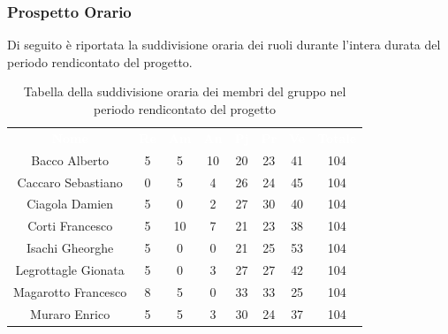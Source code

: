 \subsubsection{Prospetto Orario}
Di seguito è riportata la suddivisione oraria dei ruoli durante l'intera durata del periodo rendicontato del progetto.


\begin{table}[H]	
	\begin{center}
	    \begin{tabular}{cccccccc}
			\rowcolor{greySWEight}
			\textcolor{white}{\textbf{Nome}} & \textcolor{white}{\textbf{Re}} & \textcolor{white}{\textbf{Am}} & \textcolor{white}{\textbf{An}} & \textcolor{white}{\textbf{Pj}} & \textcolor{white}{\textbf{Pr}} & \textcolor{white}{\textbf{Ve}} & \textcolor{white}{\textbf{Totale}}
			\\			
			Bacco Alberto & 5 & 5 & 10 & 20 & 23 & 41 & 104 \\
			Caccaro Sebastiano & 0 & 5 & 4 & 26 & 24 & 45 & 104 \\
			Ciagola Damien & 5 & 0 & 2 & 27 & 30 & 40 & 104 \\
			Corti Francesco & 5 & 10 & 7 & 21 & 23 & 38 & 104 \\
			Isachi Gheorghe & 5 & 0 & 0 & 21 & 25 & 53 & 104 \\
			Legrottagle Gionata & 5 & 0 & 3 & 27 & 27 & 42 & 104 \\
			Magarotto Francesco & 8 & 5 & 0 & 33 & 33 & 25 & 104 \\
			Muraro Enrico & 5 & 5 & 3 & 30 & 24 & 37 & 104 \\


			\end{tabular}
	    \caption{Tabella della suddivisione oraria dei membri del gruppo nel periodo rendicontato del progetto} \label{tab:tabellaPersoneTotale} 
	\end{center}
\end{table}

